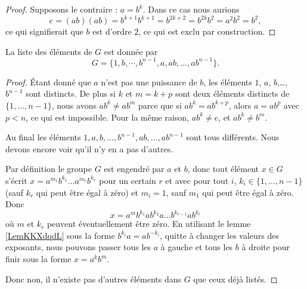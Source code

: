 \begin{proof}
    Supposons le contraire : \( a=b^k\). Dans ce cas nous aurions
    \begin{equation}
        e=(ab)(ab)=b^{k+1}b^{k+1}=b^{2k+2}=b^{2k}b^2=a^2b^2=b^2,
    \end{equation}
    ce qui signifierait que \( b\) est d'ordre \( 2\), ce qui est exclu par construction.
\end{proof}

\begin{proposition}
    La liste des éléments de \( G\) est donnée par
    \begin{equation}
        G=\{ 1,b,\cdots,b^{n-1},a,ab,\ldots, ab^{n-1} \}.
    \end{equation}
\end{proposition}

\begin{proof}
    Étant donné que \( a\) n'est pas une puissance de \( b\), les éléments \( 1\), \( a\), \( b\),\ldots, \( b^{n-1}\) sont distincts. De plus si \( k\) et \( m=k+p\) sont deux éléments distincts de \( \{ 1,\ldots, n-1 \}\), nous avons \( ab^k\neq ab^m\) parce que si \( ab^k=ab^{k+p}\), alors \( a=ab^p\) avec \( p<n\), ce qui est impossible. Pour la même raison, \( ab^k\neq e\), et \( ab^k\neq b^m\).

    Au final les éléments \( 1,a,b,\ldots, b^{n-1},ab,\ldots, ab^{n-1}\) sont tous différents. Nous devons encore voir qu'il n'y en a pas d'autres.

    Par définition le groupe \( G\) est engendré par \( a\) et \( b\), donc tout élément \( x\in G\) s'écrit $x=a^{m_1}b^{k_1}\ldots a^{m_r}b^{k_r}$ pour un certain \( r\) et avec pour tout \( i\), \( k_i\in\{ 1,\ldots, n-1 \}\) (sauf \( k_r\) qui peut être égal à zéro) et \( m_i=1\), sauf \( m_1\) qui peut être égal à zéro. Donc
    \begin{equation}
        x=a^mb^{k_1}ab^{k_2}a\ldots b^{k_{r-1}}ab^{k_r}
    \end{equation}
    où \( m\) et \( k_r\) peuvent éventuellement être zéro. En utilisant le lemme \ref{LemKKXdqdL} sous la forme \( b^{k_i}a=ab^{-k_i}\), quitte à changer les valeurs des exposants, nous pouvons passer tous les \( a \) à gauche et tous les \( b\) à droite pour finir sous la forme \( x=a^kb^m\). 

    Donc non, il n'existe pas d'autres éléments dans \( G\) que ceux déjà listés.

\end{proof}

